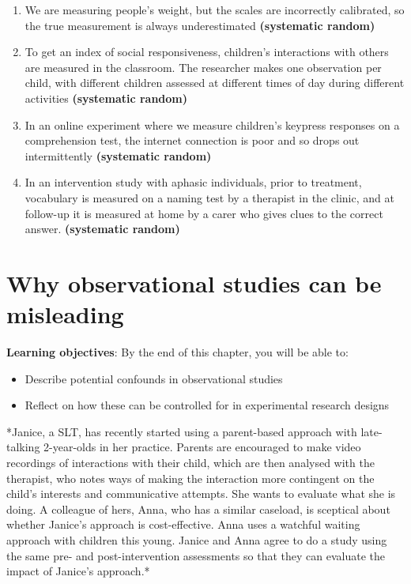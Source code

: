 \documentclass{krantz}
\providecommand{\tightlist}{%
\setlength{\itemsep}{0pt}\setlength{\parskip}{0pt}}
\begin{document}
\begin{enumerate}
\def\labelenumi{\arabic{enumi}.}
\tightlist
\item
  We are measuring people's weight, but the scales are incorrectly calibrated, so the true measurement is always underestimated \textbf{(systematic \textbar{} random)}\\
\item
  To get an index of social responsiveness, children's interactions with others are measured in the classroom. The researcher makes one observation per child, with different children assessed at different times of day during different activities \textbf{(systematic \textbar{} random)}\\
\item
  In an online experiment where we measure children's keypress responses on a comprehension test, the internet connection is poor and so drops out intermittently \textbf{(systematic \textbar{} random)}\\
\item
  In an intervention study with aphasic individuals, prior to treatment, vocabulary is measured on a naming test by a therapist in the clinic, and at follow-up it is measured at home by a carer who gives clues to the correct answer. \textbf{(systematic \textbar{} random)}
\end{enumerate}

\hypertarget{observations}{%
\chapter{Why observational studies can be misleading}\label{observations}}

\textbf{Learning objectives}: By the end of this chapter, you will be able to:

\begin{itemize}
\item
  Describe potential confounds in observational studies
\item
  Reflect on how these can be controlled for in experimental research designs
\end{itemize}

\begin{shaded}
*Janice, a SLT, has recently started using a parent-based approach with late-talking 2-year-olds in her practice. Parents are encouraged to make video recordings of interactions with their child, which are then analysed with the therapist, who notes ways of making the interaction more contingent on the child's interests and communicative attempts. She wants to evaluate what she is doing. A colleague of hers, Anna, who has a similar caseload, is sceptical about whether Janice's approach is cost-effective. Anna uses a watchful waiting approach with children this young. Janice and Anna agree to do a study using the same pre- and post-intervention assessments so that they can evaluate the impact of Janice's approach.*  
\end{shaded}
\end{document}
